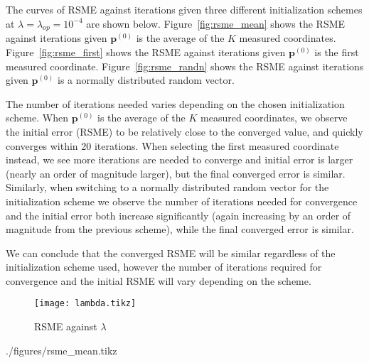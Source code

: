 \documentclass[12pt]{article}
\begin{document}
The curves of RSME against iterations given three different initialization schemes at $\lambda = \lambda_{op} = 10^{-4}$ are shown below. Figure~\ref{fig:rsme_mean} shows the RSME against iterations given $\mathbf{p}^{(0)}$ is the average of the $K$ measured coordinates. Figure~\ref{fig:rsme_first} shows the RSME against iterations given $\mathbf{p}^{(0)}$ is the first measured coordinate. Figure~\ref{fig:rsme_randn} shows the RSME against iterations given $\mathbf{p}^{(0)}$ is a normally distributed random vector.

The number of iterations needed varies depending on the chosen initialization scheme. When $\mathbf{p}^{(0)}$ is the average of the $K$ measured coordinates, we observe the initial error (RSME) to be relatively close to the converged value, and quickly converges within 20 iterations. When selecting the first measured coordinate instead, we see more iterations are needed to converge and initial error is larger (nearly an order of magnitude larger), but the final converged error is similar. Similarly, when switching to a normally distributed random vector for the initialization scheme we observe the number of iterations needed for convergence and the initial error both increase significantly (again increasing by an order of magnitude from the previous scheme), while the final converged error is similar.

We can conclude that the converged RSME will be similar regardless of the initialization scheme used, however the number of iterations required for convergence and the initial RSME will vary depending on the scheme.

\begin{figure}[htp]
    \centering
    \caption{RSME against $\lambda$}
    \label{fig:lambda}
    \texttt{[image: lambda.tikz]}
\end{figure}

\begin{filecontents}[overwrite]{./figures/rsme_mean.tikz}
\end{filecontents}
\end{document}
